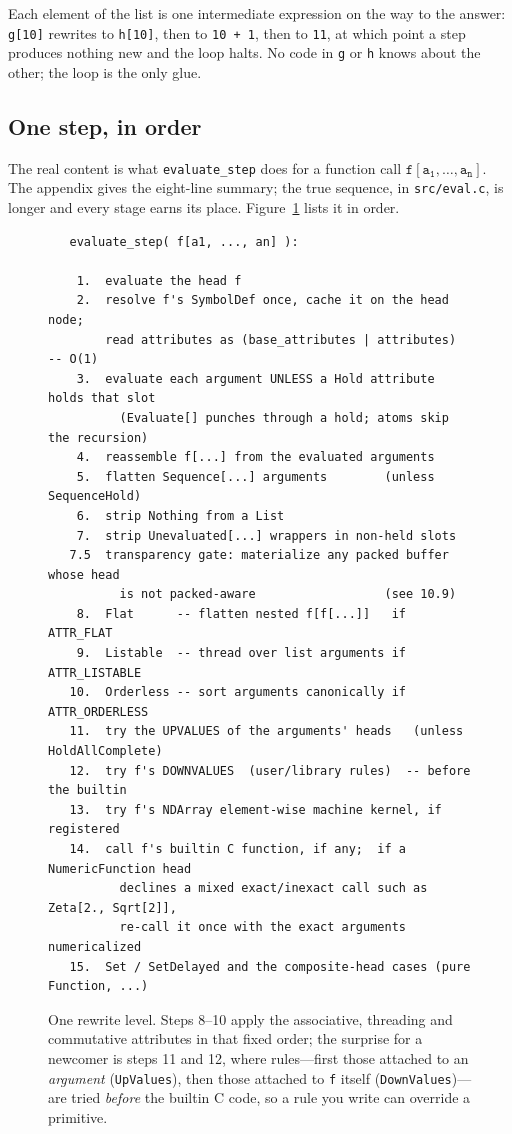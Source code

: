 
Each element of the  list is one intermediate expression on the way to the
answer: \texttt{g[10]} rewrites to \texttt{h[10]}, then to \texttt{10 + 1}, then to
\texttt{11}, at which point a step produces nothing new and the loop halts. No code in
\texttt{g} or \texttt{h} knows about the other; the loop is the only glue.

\subsection*{One step, in order}

The real content is what \texttt{evaluate\_step} does for a function call
\(\mathtt{f[a_1, \dots, a_n]}\). The appendix gives the eight-line summary; the true
sequence, in \texttt{src/eval.c}, is longer and every stage earns its place.
Figure~\ref{fig:evalstep} lists it in order.

\begin{figure}[h]
\begin{framed}
\small
\begin{verbatim}
   evaluate_step( f[a1, ..., an] ):

    1.  evaluate the head f
    2.  resolve f's SymbolDef once, cache it on the head node;
        read attributes as (base_attributes | attributes)  -- O(1)
    3.  evaluate each argument UNLESS a Hold attribute holds that slot
          (Evaluate[] punches through a hold; atoms skip the recursion)
    4.  reassemble f[...] from the evaluated arguments
    5.  flatten Sequence[...] arguments        (unless SequenceHold)
    6.  strip Nothing from a List
    7.  strip Unevaluated[...] wrappers in non-held slots
   7.5  transparency gate: materialize any packed buffer whose head
          is not packed-aware                  (see 10.9)
    8.  Flat      -- flatten nested f[f[...]]   if ATTR_FLAT
    9.  Listable  -- thread over list arguments if ATTR_LISTABLE
   10.  Orderless -- sort arguments canonically if ATTR_ORDERLESS
   11.  try the UPVALUES of the arguments' heads   (unless HoldAllComplete)
   12.  try f's DOWNVALUES  (user/library rules)  -- before the builtin
   13.  try f's NDArray element-wise machine kernel, if registered
   14.  call f's builtin C function, if any;  if a NumericFunction head
          declines a mixed exact/inexact call such as Zeta[2., Sqrt[2]],
          re-call it once with the exact arguments numericalized
   15.  Set / SetDelayed and the composite-head cases (pure Function, ...)
\end{verbatim}
\end{framed}
\caption{One rewrite level. Steps 8--10 apply the associative, threading and
commutative attributes in that fixed order; the surprise for a newcomer is steps 11
and 12, where rules---first those attached to an \emph{argument} (\texttt{UpValues}),
then those attached to \texttt{f} itself (\texttt{DownValues})---are tried \emph{before}
the builtin C code, so a rule you write can override a primitive.}
\label{fig:evalstep}
\end{figure}

